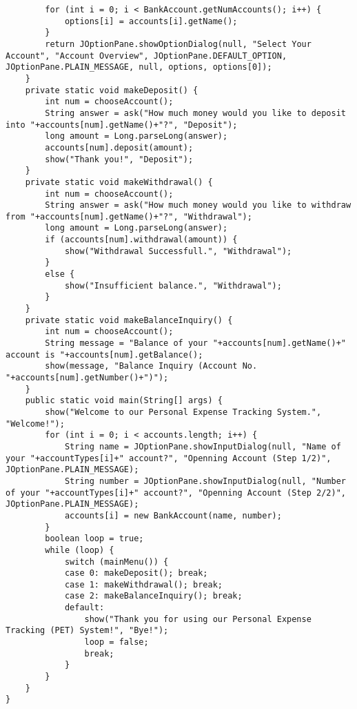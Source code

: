 \begin{enumerate}
\begin{lstlisting}
		for (int i = 0; i < BankAccount.getNumAccounts(); i++) {
			options[i] = accounts[i].getName();
		}
		return JOptionPane.showOptionDialog(null, "Select Your Account", "Account Overview", JOptionPane.DEFAULT_OPTION, JOptionPane.PLAIN_MESSAGE, null, options, options[0]);
	}
	private static void makeDeposit() {
		int num = chooseAccount();
		String answer = ask("How much money would you like to deposit into "+accounts[num].getName()+"?", "Deposit");
		long amount = Long.parseLong(answer);
		accounts[num].deposit(amount);
		show("Thank you!", "Deposit");
	}
	private static void makeWithdrawal() {
		int num = chooseAccount();
		String answer = ask("How much money would you like to withdraw from "+accounts[num].getName()+"?", "Withdrawal");
		long amount = Long.parseLong(answer);
		if (accounts[num].withdrawal(amount)) {
			show("Withdrawal Successfull.", "Withdrawal");
		}
		else {
			show("Insufficient balance.", "Withdrawal");
		}
	}
	private static void makeBalanceInquiry() {
		int num = chooseAccount();
		String message = "Balance of your "+accounts[num].getName()+" account is "+accounts[num].getBalance();
		show(message, "Balance Inquiry (Account No. "+accounts[num].getNumber()+")");
	}
	public static void main(String[] args) {
		show("Welcome to our Personal Expense Tracking System.", "Welcome!");
		for (int i = 0; i < accounts.length; i++) {
			String name = JOptionPane.showInputDialog(null, "Name of your "+accountTypes[i]+" account?", "Openning Account (Step 1/2)", JOptionPane.PLAIN_MESSAGE);
			String number = JOptionPane.showInputDialog(null, "Number of your "+accountTypes[i]+" account?", "Openning Account (Step 2/2)", JOptionPane.PLAIN_MESSAGE);
			accounts[i] = new BankAccount(name, number);
		}
		boolean loop = true;
		while (loop) {
			switch (mainMenu()) {
			case 0: makeDeposit(); break;
			case 1:	makeWithdrawal(); break;
			case 2:	makeBalanceInquiry(); break;
			default:
				show("Thank you for using our Personal Expense Tracking (PET) System!", "Bye!");
				loop = false;
				break;
			}
		}
	}
}
\end{lstlisting}
\end{enumerate}
